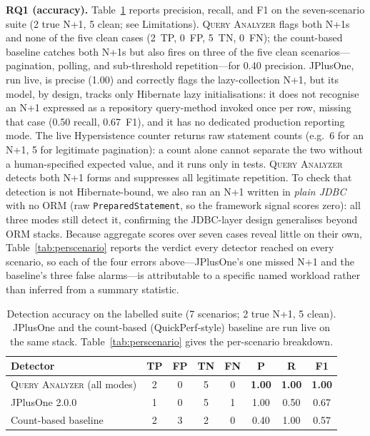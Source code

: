 \documentclass[sigplan,screen]{acmart}
\newcommand{\tool}{\textsc{Query Analyzer}}
\newcommand{\code}[1]{\texttt{\small #1}}
\begin{document}
\noindent\textbf{RQ1 (accuracy).} Table~\ref{tab:accuracy} reports precision,
recall, and F1 on the seven-scenario suite (2 true N+1, 5 clean; see
Limitations). \tool{} flags both N+1s and none of the five clean cases
(2~TP, 0~FP, 5~TN, 0~FN); the count-based baseline catches both N+1s but also
fires on three of the five clean scenarios---pagination, polling, and
sub-threshold repetition---for 0.40 precision. JPlusOne, run live, is precise
(1.00) and correctly flags the lazy-collection N+1, but its model, by design,
tracks only Hibernate lazy initialisations: it does not recognise an N+1
expressed as a repository query-method invoked once per row, missing that case
(0.50 recall, 0.67~F1), and it has no dedicated production reporting mode. The live Hypersistence counter returns raw statement
counts (e.g.\ 6 for an N+1, 5 for legitimate pagination): a count alone cannot
separate the two without a human-specified expected value, and it runs only in
tests. \tool{} detects both N+1 forms and suppresses all legitimate repetition.
To check that detection is not Hibernate-bound, we also ran an N+1 written in
\emph{plain JDBC} with no ORM (raw \code{PreparedStatement}, so the framework
signal scores zero): all three modes still detect it, confirming the
JDBC-layer design generalises beyond ORM stacks.
Because aggregate scores over seven cases reveal little on their own,
Table~\ref{tab:perscenario} reports the verdict every detector reached on every
scenario, so each of the four errors above---JPlusOne's one missed N+1 and the
baseline's three false alarms---is attributable to a specific named workload
rather than inferred from a summary statistic.

\begin{table}[t]
\centering
\caption{Detection accuracy on the labelled suite (7 scenarios; 2 true N+1, 5
clean). JPlusOne and the count-based (QuickPerf-style) baseline are run live on
the same stack. Table~\ref{tab:perscenario} gives the per-scenario breakdown.}
\label{tab:accuracy}
\small
\setlength{\tabcolsep}{2.5pt}
\begin{tabular}{lccccccc}
\toprule
Detector & TP & FP & TN & FN & P & R & F1 \\
\midrule
\tool{} (all modes)  & 2 & 0 & 5 & 0 & \textbf{1.00} & \textbf{1.00} & \textbf{1.00} \\
JPlusOne 2.0.0       & 1 & 0 & 5 & 1 & 1.00 & 0.50 & 0.67 \\
Count-based baseline & 2 & 3 & 2 & 0 & 0.40 & 1.00 & 0.57 \\
\bottomrule
\end{tabular}
\vspace{-4pt}
\end{table}
\end{document}
